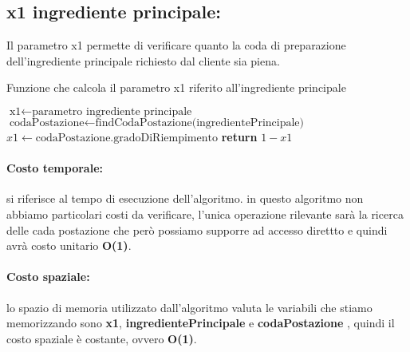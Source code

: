 \subsection{x1 ingrediente principale:}
Il  parametro x1 permette di verificare quanto la coda di preparazione dell'ingrediente principale richiesto dal cliente sia piena.
\begin{algorithm}[h]
	\begin{algorithmic}[h!]
		\caption{Funzione che calcola il parametro x1 riferito all'ingrediente principale}
		\medskip
		\State $\text{x1} \gets \text{parametro ingrediente principale}$
		\medskip
		\State $\text{codaPostazione} \gets \text{findCodaPostazione(ingredientePrincipale)}$
		\State $x1 \gets {\text{codaPostazione.gradoDiRiempimento}}$
		\State \textbf{return} $ 1 - x1$
		\EndFunction
	\end{algorithmic}
\end{algorithm}

\paragraph{Costo temporale:}
si riferisce al tempo di esecuzione dell’algoritmo. in questo algoritmo non abbiamo particolari costi da verificare, l'unica operazione rilevante sarà la ricerca delle cada postazione che però possiamo supporre  ad accesso direttto e quindi avrà costo unitario \textbf{O(1)}.

\paragraph{Costo spaziale:}
lo spazio di memoria utilizzato dall’algoritmo valuta le variabili che stiamo memorizzando sono \textbf{x1}, \textbf{ingredientePrincipale} e \textbf{codaPostazione} , quindi il costo spaziale è costante, ovvero \textbf{O(1)}.

